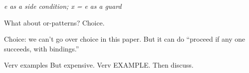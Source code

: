 \documentclass[manuscript,screen,review, 12pt]{acmart}
\begin{document}
\begin{outline}[enumerate]
    \2 \it{e} as a side condition; \it{x = e} as a guard 

    \2 What about or-patterns? Choice. 

    \2 Choice: we can't go over choice in this paper. But it can do “proceed if
    any one succeeds, with bindings.” 











    

    \2 Verv examples 
    \2 But expensive. Verv EXAMPLE. Then discuss. 


\end{outline}
\end{document}
